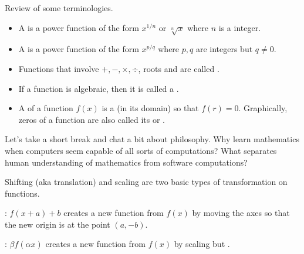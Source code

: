 \documentclass[../main.tex]{subfiles}
\begin{document}
  Review of some terminologies. 
  \begin{itemize}[wide, noitemsep]
    \item A  is a power function of the form \(x^{1/n}\) or \(\sqrt[n]{x}\) where \(n\) is a  integer. 

    \item A  is a power function of the form \(x^{p/q}\) where \(p,q\) are integers but \(q \ne 0\).

    \item Functions that involve \(+, -, \times, \div\), roots and  are called . 

    \item If a function is  algebraic, then it is called a .

    \item A  of a function \(f(x)\) is a  (in its domain) so that \(f(r) = 0\).  Graphically, zeros of a function are also called its  or \hlmain{\underline{\hspace{1in}}}.
  \end{itemize}

  Let's take a short break and chat a bit about philosophy. \faComments{} Why learn mathematics when computers seem capable of all sorts of computations? \faComments{} What separates human understanding of mathematics from software computations?

  \clearpage

  Shifting (aka translation) and scaling are two basic types of transformation on functions.

  : \(f(x + a) + b\) creates a new function from \(f(x)\) by moving the axes so that the new origin is at the point \((a, -b)\).

  : \(\beta f(\alpha x)\) creates a new function from \(f(x)\) by scaling  but .
\end{document}
